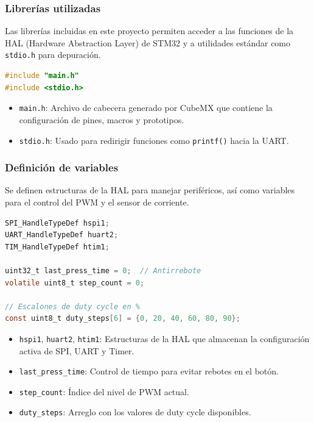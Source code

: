 \documentclass[a4paper,12pt]{article}
\begin{document}
\subsubsection{Librerías utilizadas}

Las librerías incluidas en este proyecto permiten acceder a las funciones de la HAL (Hardware Abstraction Layer) de STM32 y a utilidades estándar como \texttt{stdio.h} para depuración.

\begin{lstlisting}[language=C, caption={Librerías incluidas en \texttt{main.c}}, label={cod:libs}]
#include "main.h"
#include <stdio.h>
\end{lstlisting}

\begin{itemize}
    \item \texttt{main.h}: Archivo de cabecera generado por CubeMX que contiene la configuración de pines, macros y prototipos.
    \item \texttt{stdio.h}: Usado para redirigir funciones como \texttt{printf()} hacia la UART.
\end{itemize}


\subsubsection{Definición de variables}

Se definen estructuras de la HAL para manejar periféricos, así como variables para el control del PWM y el sensor de corriente.

\begin{lstlisting}[language=C, caption={Variables globales}, label={cod:variables}]
SPI_HandleTypeDef hspi1;
UART_HandleTypeDef huart2;
TIM_HandleTypeDef htim1;

uint32_t last_press_time = 0;  // Antirrebote
volatile uint8_t step_count = 0;

// Escalones de duty cycle en %
const uint8_t duty_steps[6] = {0, 20, 40, 60, 80, 90};
\end{lstlisting}

\begin{itemize}
    \item \texttt{hspi1}, \texttt{huart2}, \texttt{htim1}: Estructuras de la HAL que almacenan la configuración activa de SPI, UART y Timer.
    \item \texttt{last\_press\_time}: Control de tiempo para evitar rebotes en el botón.
    \item \texttt{step\_count}: Índice del nivel de PWM actual.
    \item \texttt{duty\_steps}: Arreglo con los valores de duty cycle disponibles.
\end{itemize}
\end{document}
